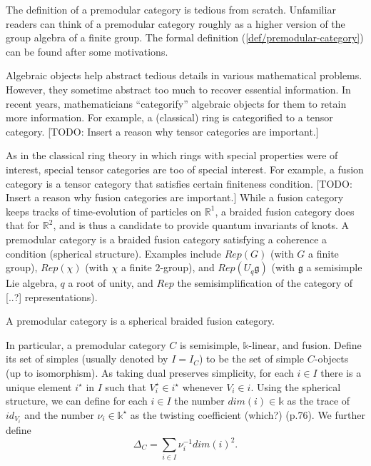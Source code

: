 The definition of a premodular category is tedious from scratch.
Unfamiliar readers can think of a premodular category roughly as
a higher version of the group algebra of a finite group. The
formal definition (\ref{def/premodular-category}) can be found
after some motivations.

Algebraic objects help abstract tedious details in various
mathematical problems. However, they sometime abstract too much
to recover essential information. In recent years, mathematicians
``categorify'' algebraic objects for them to retain more
information. For example, a (classical) ring is categorified to a
tensor category. [TODO: Insert a reason why tensor categories are
important.]

As in the classical ring theory in which rings with special
properties were of interest, special tensor categories are too of
special interest. For example, a fusion category is a tensor
category that satisfies certain finiteness condition. [TODO:
Insert a reason why fusion categories are important.] While a
fusion category keeps tracks of time-evolution of particles on
$\mathbb{R}^{1}$, a braided fusion category does that for
$\mathbb{R}^{2}$, and is thus a candidate to provide quantum
invariants of knots. A premodular category is a braided fusion
category satisfying a coherence a condition (spherical
structure). Examples include $Rep(G)$ (with $G$ a finite group),
$Rep(\chi)$ (with $\chi$ a finite $2$-group), and
$Rep(U_{q}\mathfrak{g})$ (with $\mathfrak{g}$ a semisimple Lie
algebra, $q$ a root of unity, and $Rep$ the semisimplification of
the category of [..?] representations).

\begin{definition}\label{def/premodular-category}
  A premodular category is a spherical braided fusion category.
\end{definition}

\noindent In particular, a premodular category $C$ is semisimple,
$\mathbb{k}$-linear, and fusion. Define its set of simples
(usually denoted by $I = I_{C}$) to be the set of simple
$C$-objects (up to isomorphism). As taking dual preserves
simplicity, for each $i \in I$ there is a unique element
$i^{\star}$ in $I$ such that $V_{i}^{\star} \in i^{\star}$
whenever $V_{i} \in i$. Using the spherical structure, we can
define for each $i \in I$ the number $dim(i) \in \mathbb{k}$ as
the trace of $id_{V_{i}}$ and the number
$\nu_{i} \in \mathbb{k}^{\star}$ as the twisting coefficient
(which?) (p.76). We further define
$$\Delta_{C} = \sum_{i \in I} \nu_{i}^{-1}dim(i)^{2}.$$

